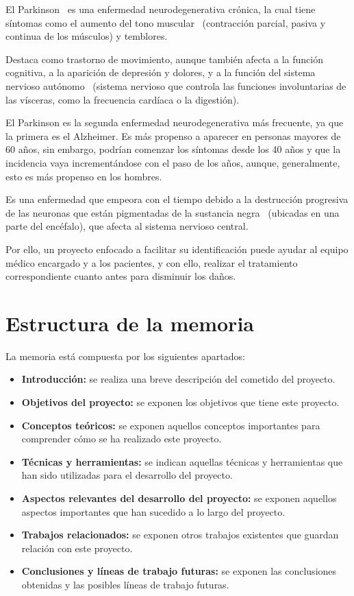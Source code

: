 El Parkinson~\cite{parkinson} es una enfermedad neurodegenerativa crónica, la cual tiene síntomas como el aumento del tono muscular~\cite{tonomuscular} (contracción parcial, pasiva y continua de los músculos) y temblores.

Destaca como trastorno de movimiento, aunque también afecta a la función cognitiva, a la aparición de depresión y dolores, y a la función del sistema nervioso autónomo~\cite{sistnervautonomo} (sistema nervioso que controla las funciones involuntarias de las vísceras, como la frecuencia cardíaca o la digestión).

El Parkinson es la segunda enfermedad neurodegenerativa más frecuente, ya que la primera es el Alzheimer. Es más propenso a aparecer en personas mayores de 60 años, sin embargo, podrían comenzar los síntomas desde los 40 años y que la incidencia vaya incrementándose con el paso de los años, aunque, generalmente, esto es más propenso en los hombres.

Es una enfermedad que empeora con el tiempo debido a la destrucción progresiva de las neuronas que están pigmentadas de la sustancia negra~\cite{sustancianegra} (ubicadas en una parte del encéfalo), que afecta al sistema nervioso central.

Por ello, un proyecto enfocado a facilitar su identificación puede ayudar al equipo médico encargado y a los pacientes, y con ello, realizar el tratamiento correspondiente cuanto antes para disminuir los daños.

\section{Estructura de la memoria}
La memoria está compuesta por los siguientes apartados:
\begin{itemize}
	\item \textbf{Introducción:} se realiza una breve descripción del cometido del proyecto.
	\item \textbf{Objetivos del proyecto:} se exponen los objetivos que tiene este proyecto.
	\item \textbf{Conceptos teóricos:} se exponen aquellos conceptos importantes para comprender cómo se ha realizado este proyecto.
	\item \textbf{Técnicas y herramientas:} se indican aquellas técnicas y herramientas que han sido utilizadas para el desarrollo del proyecto.
	\item \textbf{Aspectos relevantes del desarrollo del proyecto:} se exponen aquellos aspectos importantes que han sucedido a lo largo del proyecto.
	\item \textbf{Trabajos relacionados:} se exponen otros trabajos existentes que guardan relación con este proyecto.
	\item \textbf{Conclusiones y líneas de trabajo futuras:} se exponen las conclusiones obtenidas y las posibles líneas de trabajo futuras.
\end{itemize}

